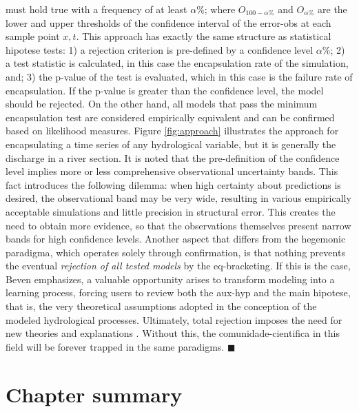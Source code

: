 \documentclass[./main_en.tex]{subfiles}
\begin{document}
must hold true with a frequency of at least $\alpha\%$; where $O_{100-\alpha\%}$ and $O_{\alpha\%}$ are the lower and upper thresholds of the confidence interval of the \gls{error-obs} at each sample point $x, t$. This approach has exactly the same structure as statistical \gls{hipotese} tests: 1) a rejection criterion is pre-defined by a confidence level $\alpha$\%; 2) a test statistic is calculated, in this case the encapsulation rate of the simulation, and; 3) the p-value of the test is evaluated, which in this case is the failure rate of encapsulation. If the p-value is greater than the confidence level, the \gls{model} should be rejected. On the other hand, all models that pass the minimum encapsulation test are considered empirically equivalent and can be confirmed based on \gls{likelihood} measures. Figure \ref{fig:approach} illustrates the approach for encapsulating a time series of any hydrological variable, but it is generally the discharge in a river section. It is noted that the pre-definition of the confidence level implies more or less comprehensive observational uncertainty bands. This fact introduces the following dilemma: when high certainty about predictions is desired, the observational band may be very wide, resulting in various empirically acceptable simulations and little precision in structural error. This creates the need to obtain more evidence, so that the observations themselves present narrow bands for high confidence levels. Another aspect that differs from the hegemonic \gls{paradigma}, which operates solely through confirmation, is that nothing prevents the eventual \textit{rejection of all tested models} by the \gls{eq-bracketing}. If this is the case, Beven emphasizes, a valuable opportunity arises to transform modeling into a learning process, forcing users to review both the \gls{aux-hyp} and the main \gls{hipotese}, that is, the very theoretical assumptions adopted in the conception of the modeled hydrological processes. Ultimately, total rejection imposes the need for new theories and explanations \cite{Beven2018}. Without this, the \gls{comunidade-cientifica} in this field will be forever trapped in the same paradigms. $\blacksquare$

\clearpage

\section{Chapter summary} \label{sec:epis:summary}
\end{document}
